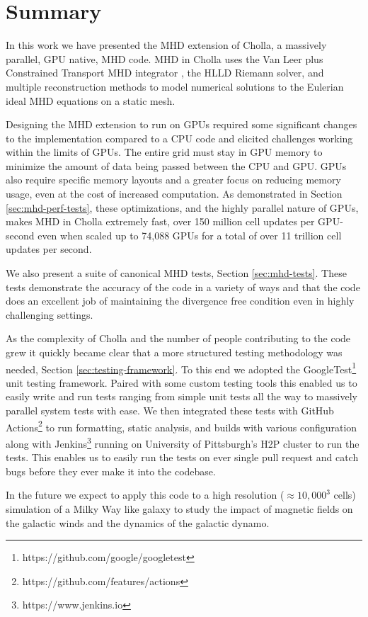\section{Summary}
\label{sec:summary}

In this work we have presented the MHD extension of Cholla, a massively parallel, GPU native, MHD code. MHD in Cholla uses the Van Leer plus Constrained Transport MHD integrator \citep{stone_2009}, the HLLD Riemann solver, and multiple reconstruction methods to model numerical solutions to the Eulerian ideal MHD equations on a static mesh.

Designing the MHD extension to run on GPUs required some significant changes to the implementation compared to a CPU code and elicited challenges working within the limits of GPUs. The entire grid must stay in GPU memory to minimize the amount of data being passed between the CPU and GPU. GPUs also require specific memory layouts and a greater focus on reducing memory usage, even at the cost of increased computation. As demonstrated in Section \ref{sec:mhd-perf-tests}, these optimizations, and the highly parallel nature of GPUs, makes MHD in Cholla extremely fast, over 150 million cell updates per GPU-second even when scaled up to 74,088 GPUs for a total of over 11 trillion cell updates per second. 

We also present a suite of canonical MHD tests, Section \ref{sec:mhd-tests}. These tests demonstrate the accuracy of the code in a variety of ways and that the code does an excellent job of maintaining the divergence free condition even in highly challenging settings. 

As the complexity of Cholla and the number of people contributing to the code grew it quickly became clear that a more structured testing methodology was needed, Section \ref{sec:testing-framework}. To this end we adopted the GoogleTest\footnote{https://github.com/google/googletest} unit testing framework. Paired with some custom testing tools this enabled us to easily write and run tests ranging from simple unit tests all the way to massively parallel system tests with ease. We then integrated these tests with GitHub Actions\footnote{https://github.com/features/actions} to run formatting, static analysis, and builds with various configuration along with Jenkins\footnote{https://www.jenkins.io} running on University of Pittsburgh's H2P cluster to run the tests. This enables us to easily run the tests on ever single pull request and catch bugs before they ever make it into the codebase.

In the future we expect to apply this code to a high resolution ($\approx 10,000^3$ cells) simulation of a Milky Way like galaxy to study the impact of magnetic fields on the galactic winds and the dynamics of the galactic dynamo.